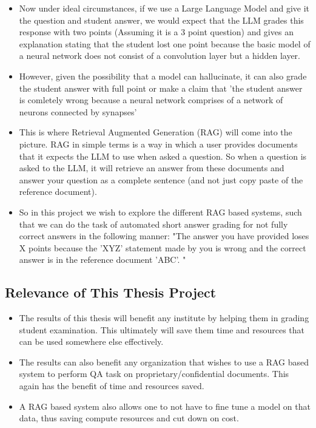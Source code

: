 \documentclass[thesis]{mas_proposal}
\begin{document}
\begin{itemize}
    \item Now under ideal circumstances, if we use a Large Language Model and give it the question and student answer, we would expect that the LLM grades this response with two points (Assuming it is a 3 point question) and gives an explanation stating that the student lost one point because the basic model of a neural network does not consist of a convolution layer but a hidden layer.
    \item However, given the possibility that a model can hallucinate, it can also grade the student answer with full point or make a claim that 'the student answer is comletely wrong because a neural network comprises of a network of neurons connected by synapses'
    \item This is where Retrieval Augmented Generation (RAG) will come into the picture. RAG in simple terms is a way in which a user provides documents that it expects the LLM to use when asked a question. So when a question is asked to the LLM, it will retrieve an answer from these documents and answer your question as a complete sentence (and not just copy paste of the reference document).
    \item So in this project we wish to explore the different RAG based systems, such that we can do the task of automated short answer grading for not fully correct answers in the following manner: "The answer you have provided loses X points because the 'XYZ' statement made by you is wrong and the correct answer is in the reference document 'ABC'. "
\end{itemize}

\subsection{Relevance of This Thesis Project}
\begin{itemize}
    \item The results of this thesis will benefit any institute by helping them in grading student examination. This ultimately will save them time and resources that can be used somewhere else effectively.
    \item The results can also benefit any organization that wishes to use a RAG based system to perform QA task on proprietary/confidential documents. This again has the benefit of time and resources saved.
    \item A RAG based system also allows one to not have to fine tune a model on that data, thus saving compute resources and cut down on cost.
 \end{itemize}
\end{document}
